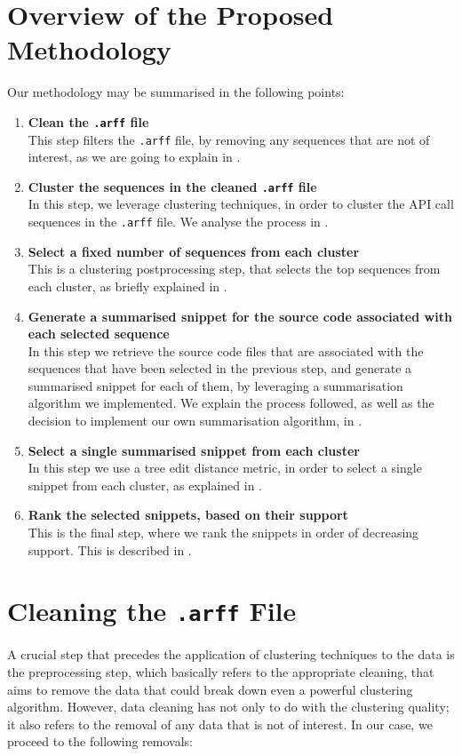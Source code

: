\section{Overview of the Proposed Methodology}
\label{sec:methodology-overview}

Our methodology may be summarised in the following points:

\newcommand\litem[1]{\item{\bfseries #1\\}}
\begin{enumerate}
\litem{Clean the \texttt{.arff} file} This step filters the \texttt{.arff} file, by removing any sequences that are not of interest, as we are going to explain in .
\litem{Cluster the sequences in the cleaned \texttt{.arff} file} In this step, we leverage clustering techniques, in order to cluster the API call sequences in the \texttt{.arff} file. We analyse the process in .
\litem{Select a fixed number of sequences from each cluster} This is a clustering postprocessing step, that selects the top sequences from each cluster, as briefly explained in .
\litem{Generate a summarised snippet for the source code associated with each selected sequence} In this step we retrieve the source code files that are associated with the sequences that have been selected in the previous step, and generate a summarised snippet for each of them, by leveraging a summarisation algorithm we implemented. We explain the process followed, as well as the decision to implement our own summarisation algorithm, in . 
\litem{Select a single summarised snippet from each cluster} In this step we use a tree edit distance metric, in order to select a single snippet from each cluster, as explained in .
\litem{Rank the selected snippets, based on their support} This is the final step, where we rank the snippets in order of decreasing support. This is described in .
\end{enumerate}


\section{Cleaning the \texttt{.arff} File}
\label{sec:data-preprocessing}

A crucial step that precedes the application of clustering techniques to the data is the preprocessing step, which basically refers to the appropriate cleaning, that aims to remove the data that could break down even a powerful clustering algorithm. However, data cleaning has not only to do with the clustering quality; it also refers to the removal of any data that is not of interest. In our case, we proceed to the following removals:

